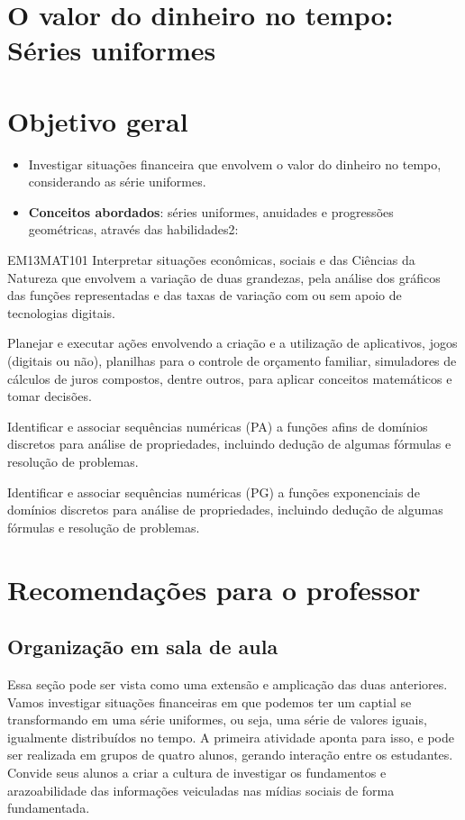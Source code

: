 \begin{paginatexto}
\section*{O valor do dinheiro no tempo: Séries uniformes}

\section*{Objetivo geral}
\begin{itemize}
\item Investigar situações financeira que envolvem o valor do dinheiro no tempo, considerando as série uniformes.

\item \textbf{Conceitos abordados}: séries uniformes, anuidades e progressões geométricas, através das habilidades2:
\end{itemize}

\begin{habilities}{EM13MAT101}
 Interpretar situações econômicas, sociais e das Ciências da Natureza
que envolvem a variação de duas grandezas, pela análise dos gráficos das funções representadas e das taxas de variação com ou sem apoio de tecnologias digitais.

Planejar e executar ações envolvendo a criação e a utilização de aplicativos, jogos (digitais ou não), planilhas para o controle de orçamento familiar, simuladores de cálculos de juros compostos, dentre outros, para aplicar conceitos matemáticos e tomar decisões. 

Identificar e associar sequências numéricas (PA) a funções afins de domínios discretos para análise de propriedades, incluindo dedução de algumas fórmulas e resolução de problemas.

Identificar e associar sequências numéricas (PG) a funções exponenciais de domínios discretos para análise de propriedades, incluindo dedução de algumas fórmulas e resolução de problemas.
\end{habilities}

\section*{Recomendações para o professor}
\vspace{-1em}
\subsection{Organização em sala de aula} Essa seção pode ser vista como uma extensão e amplicação das duas anteriores. Vamos investigar situações financeiras em que podemos ter um captial se transformando em uma série uniformes, ou seja, uma série de valores iguais, igualmente distribuídos no tempo. A primeira atividade aponta para isso, e pode ser realizada em grupos de quatro alunos, gerando interação entre os estudantes. Convide seus alunos a criar a cultura de investigar os fundamentos e arazoabilidade das informações veiculadas nas mídias sociais de forma fundamentada.


\end{paginatexto}
